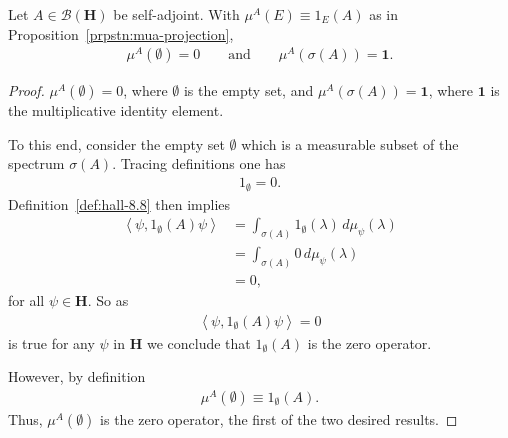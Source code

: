 \begin{proposition}
    \label{prpstn:mua-empty-and-whole}
    \leanok
    Let $A \in \mathcal{B}(\mathbf{H})$ be self-adjoint. With $\mu^A(E) \equiv 1_E(A)$ as in Proposition~\ref{prpstn:mua-projection}, 
    \begin{align}
        \mu^A(\emptyset) = 0 \qquad\text{and}\qquad \mu^A(\sigma(A)) = \mathbf{1}.
    \end{align}
\end{proposition}
\begin{proof}
    \leanok
$\mu^A(\emptyset) = 0$, where $\emptyset$ is the empty set, and $\mu^A(\sigma(A)) = \mathbf{1}$, where $\mathbf{1}$ is the multiplicative identity element.

To this end, consider the empty set $\emptyset$ which is a measurable subset of the spectrum $\sigma(A)$. Tracing definitions one has
\begin{align}
    1_\emptyset = 0.
\end{align}
Definition~\ref{def:hall-8.8} then implies
\begin{align}
    \left< \psi, 1_\emptyset(A)\psi \right> &= \int_{\sigma(A)} 1_\emptyset(\lambda) \, d\mu_\psi(\lambda) \\
                                            &= \int_{\sigma(A)} 0 \, d\mu_\psi(\lambda) \\
                                            &= 0,
\end{align}
for all $\psi \in \mathbf{H}$. So as
\begin{align}
    \left< \psi, 1_\emptyset(A)\psi \right> = 0
\end{align}
is true for any $\psi$ in $\mathbf{H}$ we conclude that $1_\emptyset(A)$ is the zero operator.

However, by definition
\begin{align}
    \mu^A(\emptyset) \equiv 1_\emptyset(A).
\end{align}
Thus, $\mu^A(\emptyset)$ is the zero operator, the first of the two desired results.


\end{proof}

